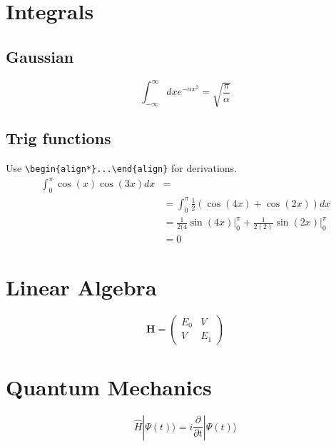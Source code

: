 \documentclass[12pt,letterpaper]{article}
\begin{document}
\section{Integrals}
\subsection{Gaussian}
\begin{equation}
    \int_{-\infty}^{\infty} dx e^{-\alpha x^2} = \sqrt{\frac{\pi}{\alpha}}
\end{equation}

\subsection{Trig functions}
Use \verb|\begin{align*}...\end{align}| for derivations.
\begin{align*}
    \int_0^\pi \cos(x) \cos(3x) dx  & = \\
    & = \int_0^\pi \frac{1}{2}\left(\cos(4x) + \cos(2x)\right) dx \\
    & = \frac{1}{2(4}\sin(4x)\Big|^\pi_0 + \frac{1}{2(2)}\sin(2x)\Big|^\pi_0 \\
    & = 0
\end{align*}

\section{Linear Algebra}
\begin{equation}
    \mathbf{H} = \begin{pmatrix}
      E_0 & V \\ 
      V & E_1
    \end{pmatrix}
\end{equation}

\section{Quantum Mechanics}
\begin{equation}
    \hat{H}|\Psi(t)\rangle = i \frac{\partial}{\partial t}|\Psi(t)\rangle
\end{equation}
\end{document}
